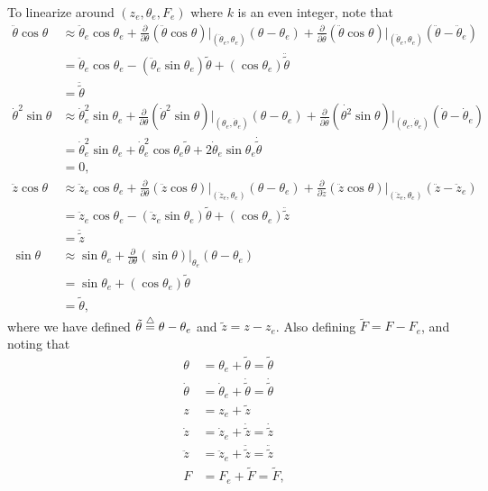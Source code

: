 To linearize around $(z_e, \theta_e, F_e)$ where $k$ is an even integer, note that
\begin{align*}
\ddot{\theta}\cos\theta &\approx 
	\ddot{\theta}_e\cos\theta_e
		+ \frac{\partial}{\partial\theta}(\ddot{\theta}\cos\theta)\Big|_{(\ddot{\theta}_e,\theta_e)}(\theta-\theta_e)
		+ \frac{\partial}{\partial\ddot{\theta}}(\ddot{\theta}\cos\theta)\Big|_{(\ddot{\theta}_e,\theta_e)}(\ddot{\theta}-\ddot{\theta}_e) \\
		&= \ddot{\theta}_e\cos\theta_e
		- (\ddot{\theta}_e\sin\theta_e)\tilde{\theta}
		+ (\cos\theta_e)\ddot{\tilde{\theta}} \\
		&= \ddot{\tilde{\theta}} \\
%
\dot{\theta}^2\sin\theta &\approx \dot{\theta}_e^2\sin\theta_e + \frac{\partial}{\partial\theta}(\dot{\theta}^2\sin\theta)\Big|_{(\theta_e,\dot{\theta}_e)}(\theta-\theta_e) 
	+ \frac{\partial}{\partial\dot{\theta}}(\dot{\theta^2}\sin\theta)\Big|_{(\theta_e,\dot{\theta}_e)}(\dot{\theta}-\dot{\theta}_e) \\
&= \dot{\theta}_e^2\sin\theta_e + \dot{\theta}_e^2\cos\theta_e\tilde{\theta} + 2\dot{\theta}_e\sin\theta_e\dot{\tilde{\theta}} \\
&= 0, \\
%
\ddot{z}\cos\theta &\approx 
	\ddot{z}_e\cos\theta_e
		+ \frac{\partial}{\partial\theta}(\ddot{z}\cos\theta)\Big|_{(\ddot{z}_e,\theta_e)}(\theta-\theta_e)
		+ \frac{\partial}{\partial\ddot{z}}(\ddot{z}\cos\theta)\Big|_{(\ddot{z}_e,\theta_e)}(\ddot{z}-\ddot{z}_e) \\
		&= \ddot{z}_e\cos\theta_e
		- (\ddot{z}_e\sin\theta_e)\tilde{\theta}
		+ (\cos\theta_e)\ddot{\tilde{z}} \\
		&= \ddot{\tilde{z}} \\
%
\sin\theta &\approx \sin\theta_e + \frac{\partial}{\partial \theta}
(\sin\theta)\Big|_{\theta_e} 
(\theta-\theta_e) \\
	&= \sin\theta_e + (\cos\theta_e) \tilde{\theta} \\
	&= \tilde{\theta},
\end{align*}
where we have defined
$\tilde{\theta}\stackrel{\triangle}{=}\theta-\theta_e$ and $\tilde{z}=z-z_e$.  Also defining $\tilde{F}=F-F_e$, and noting that
\begin{align*}
\theta &= \theta_e + \tilde{\theta} = \tilde{\theta} \\
\dot{\theta} &= \dot{\theta}_e + \dot{\tilde{\theta}} = \dot{\tilde{\theta}} \\
z &= z_e + \tilde{z} \\
\dot{z} &= \dot{z}_e + \dot{\tilde{z}} = \dot{\tilde{z}} \\
\ddot{z} &= \ddot{z}_e + \ddot{\tilde{z}} = \ddot{\tilde{z}} \\
F &= F_e + \tilde{F} = \tilde{F},
\end{align*}
